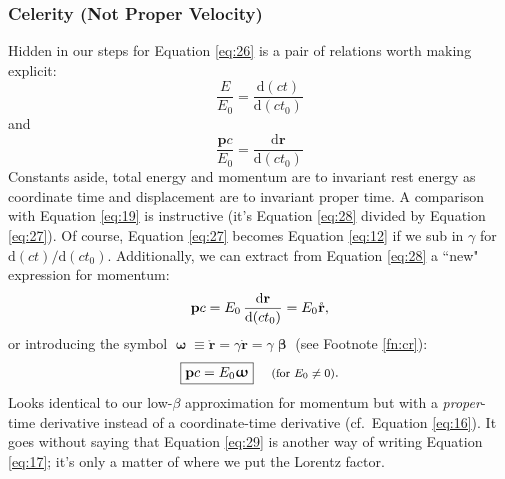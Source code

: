 \documentclass[12pt]{article}
\renewcommand{\vv}[1]{\mathbf{#1}}
\newcommand{\dd}[1]{\mathrm{d}#1}
\newcommand{\vvbeta}{\bm{\upbeta}}
\newcommand{\vvomega}{\bm{\upomega}}
\begin{document}
\subsubsection{Celerity (Not Proper Velocity)}\label{sssec:ce}

Hidden in our steps for Equation \ref{eq:26} is a pair of relations worth making explicit:
\begin{equation}\label{eq:27}
\dfrac{E}{E_0} = \dfrac{\dd (ct)}{\dd (c t_0)}
\end{equation}
and
\begin{equation}\label{eq:28}
\dfrac{\vv p c}{E_0} = \dfrac{\dd \vv r}{\dd (c t_0)}
\end{equation}
Constants aside, total energy and momentum are to invariant rest energy as coordinate time and displacement are to invariant proper time. A comparison with Equation \ref{eq:19} is instructive (it's Equation \ref{eq:28} divided by Equation \ref{eq:27}). Of course, Equation \ref{eq:27} becomes Equation \ref{eq:12} if we sub in $\gamma$ for $\dd (ct) / \dd (c t_0)$. Additionally, we can extract from Equation \ref{eq:28} a ``new" expression for momentum:
\begin{equation*}
\vv p c = E_0 \, \dfrac{\dd \vv r}{\dd (c t_0)} = E_0 \mkern.5mu \mathring{\vv r},
\end{equation*}
or introducing the symbol $\vvomega \equiv \mathring{\vv r} = \gamma \dot{\vv r} = \gamma \vvbeta$ (see Footnote \ref{fn:cr}):
\begin{equation}\label{eq:29}
\boxed{\vv p c = E_0 \vvomega} \quad \textrm{\footnotesize{ (for $E_0 \neq 0$)}}.
\end{equation}
Looks identical to our low-$\beta$ approximation for momentum but with a \emph{proper}-time derivative instead of a coordinate-time derivative (cf.\ Equation \ref{eq:16}). It goes without saying that Equation \ref{eq:29} is another way of writing Equation \ref{eq:17}; it's only a matter of where we put the Lorentz factor.
\end{document}
